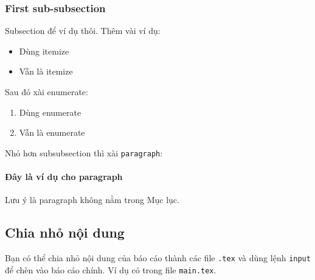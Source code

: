 \subsubsection{First sub-subsection}
Subsection để ví dụ thôi. Thêm vài ví dụ:
\begin{itemize}
    \item Dùng itemize
    \item Vẫn là itemize
\end{itemize}
Sau đó xài enumerate:
\begin{enumerate}
    \item Dùng enumerate
    \item Vẫn là enumerate
\end{enumerate}
Nhỏ hơn subsubsection thì xài \texttt{paragraph}:

\paragraph{Đây là ví dụ cho paragraph}
Lưu ý là paragraph không nằm trong Mục lục.

\subsection{Chia nhỏ nội dung}
Bạn có thể chia nhỏ nội dung của báo cáo thành các file \texttt{.tex} và dùng lệnh \texttt{input} để chèn vào báo cáo chính. Ví dụ có trong file \texttt{main.tex}.